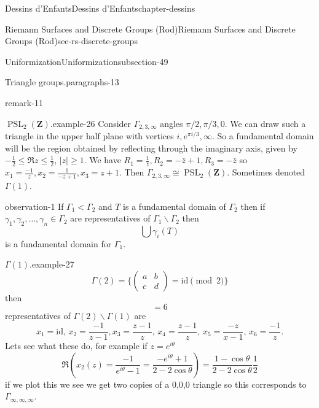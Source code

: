 \documentclass[oneside,10pt,]{book}
\numberwithin{equation}{section}
\newcommand{\ZZ}{\mathbf{Z}}
\newcommand{\id}{\mathrm{id}}
\DeclareMathOperator{\PSL}{PSL}
\newcommand{\lt}{<}
\newcommand{\amp}{&}
\begin{document}
\begin{chapterptx}{Dessins d'Enfants}{}{Dessins d'Enfants}{}{}{chapter-dessins}
\begin{sectionptx}{Riemann Surfaces and Discrete Groups (Rod)}{}{Riemann Surfaces and Discrete Groups (Rod)}{}{}{sec-rs-discrete-groups}
\begin{subsectionptx}{Uniformization}{}{Uniformization}{}{}{subsection-49}
\begin{paragraphs}{Triangle groups.}{paragraphs-13}
\begin{remark}{}{remark-11}
\end{remark}
\begin{example}{\(\PSL_2(\ZZ)\).}{example-26}%
\hypertarget{p-560}{}%
Consider \(\Gamma_{2,3,\infty}\) angles \(\pi/2, \pi/3, 0\). We can draw such a triangle in the upper half plane with vertices \(i, e^{\pi i/3}, \infty\). So a fundamental domain will be the region obtained by reflecting through the imaginary axis, given by \(-\frac 12 \le \Re z \le \frac 12\), \(|z| \ge 1\). We have \(R_1 = \frac{1}{\bar z}, R_2 = -\bar z +1,R_3 = -\bar z\) so \(x_1 = \frac{-1}{z}, x_2 = \frac{1}{-z+1}, x_3 = z+1\). Then \(\Gamma_{2,3,\infty} \cong \PSL_2(\ZZ)\). Sometimes denoted \(\Gamma(1)\).%
\end{example}
\begin{observation}{}{observation-1}%
\hypertarget{p-561}{}%
If \(\Gamma_1 \lt \Gamma_2\) and \(T\) is a fundamental domain of \(\Gamma_2\) then if \(\gamma_1, \gamma_2, \ldots, \gamma_n \in \Gamma_2\) are representatives of \(\Gamma_1\backslash \Gamma_2\) then%
\begin{equation*}
\bigcup \gamma_i (T)
\end{equation*}
is a fundamental domain for \(\Gamma_1\).%
\end{observation}
\begin{example}{\(\Gamma(1)\).}{example-27}%
\hypertarget{p-562}{}%
%
\begin{equation*}
\Gamma(2) = \{\begin{pmatrix} a\amp b \\ c\amp d\end{pmatrix} = \id \pmod 2 \}
\end{equation*}
then%
\begin{equation*}
[\Gamma(1) : \Gamma(2)] = 6
\end{equation*}
representatives of \(\Gamma(2) \backslash \Gamma(1)\) are%
\begin{equation*}
x_1 = \id,\,x_2 = \frac{-1}{z-1}, x_3 = \frac{z-1}{z},\, x_4 = \frac{z-1}{z},\,x_5 = \frac{-z}{x-1},\,x_6 = \frac{-1}{z}\text{.}
\end{equation*}
Lets see what these do, for example if \(z= e^{i\theta}\)%
\begin{equation*}
\Re(x_2(z) = \frac{-1}{e^{i\theta} - 1} = \frac{-e^{i\theta} + 1}{2- 2\cos \theta}) = \frac{1-\cos \theta}{ 2- 2\cos \theta} \frac 12
\end{equation*}
if we plot this we see we get two copies of a 0,0,0 triangle so this corresponds to \(\Gamma_{\infty,\infty,\infty}\).%
\begin{equation*}

\end{equation*}
\end{example}
\end{paragraphs}
\end{subsectionptx}
\end{sectionptx}
\end{chapterptx}
\end{document}
